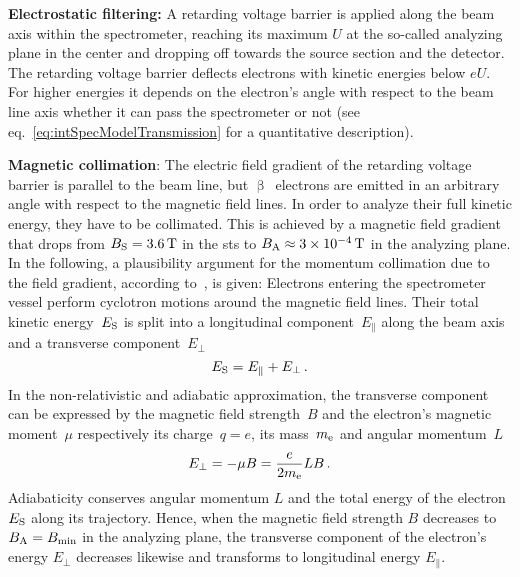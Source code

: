 {\par \textbf{Electrostatic filtering:}
A retarding voltage barrier is applied along the beam axis within the spectrometer, reaching its maximum $U$ at the so-called analyzing plane in the center and dropping off towards the source section and the detector. The retarding voltage barrier deflects electrons with kinetic energies below $eU$. For higher energies it depends on the electron's angle with respect to the beam line axis whether it can pass the spectrometer or not (see eq.~\ref{eq:intSpecModelTransmission} for a quantitative description). 

{\par \textbf{Magnetic collimation}: 
The electric field gradient of the retarding voltage barrier is parallel to the beam line, but $\upbeta$~electrons are emitted in an arbitrary angle with respect to the magnetic field lines. In order to analyze their full kinetic energy, they have to be collimated. This is achieved by a magnetic field gradient that drops from $B_\mathrm{S}=\SI{3.6}{T}$ in the \gls{sts} to $B_\mathrm{A}\approx\SI{3e-4}{T}$ in the analyzing plane. In the following, a plausibility argument for the momentum collimation due to the field gradient, according to~\cite{Angrik:2005ep}, is given: Electrons entering the spectrometer vessel perform cyclotron motions around the magnetic field lines. Their total kinetic energy~$E_\mathrm{S}$ is split into a longitudinal component~$E_\parallel$ along the beam axis and a transverse component~$E_\bot$
\begin{equation}
\label{eq:totalKinElecEnergy}
E_\mathrm{S} = E_\parallel + E_\bot \text{\,.}
\end{equation}
In the non-relativistic and adiabatic approximation, the transverse component can be expressed by the magnetic field strength~$B$ and the electron's magnetic moment~$\mu$ respectively its charge~$q=e$, its mass~$m_{\mathrm{e}}$ and angular momentum~$L$~\cite{jackson1975classical}
\begin{equation}
E_\bot = - \mu B = \frac{e}{2 m_{\mathrm{e}}}LB \text{\,.}
\end{equation}
Adiabaticity conserves angular momentum $L$ and the total energy of the electron $E_\mathrm{S}$ along its trajectory. Hence, when the magnetic field strength $B$ decreases to $B_\mathrm{A}=B_\mathrm{min}$ in the analyzing plane, the transverse component of the electron's energy $E_\bot$ decreases likewise and transforms to longitudinal energy $E_\parallel$.}

}
